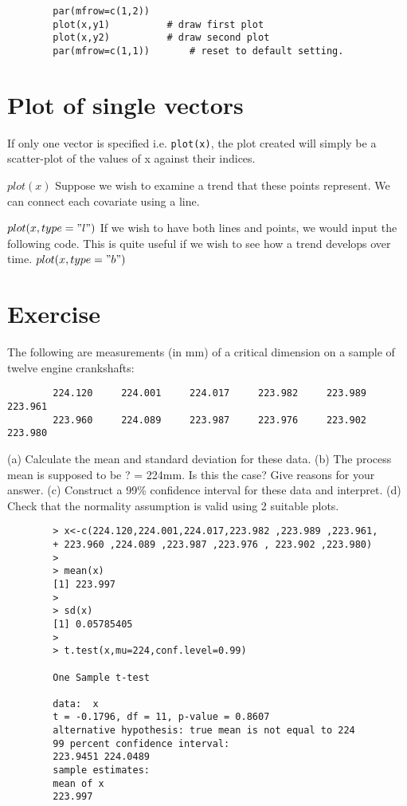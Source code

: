 \documentclass[a4paper,12pt]{article}
\begin{document}
\begin{itemize}
\begin{itemize}
		\begin{verbatim}
		par(mfrow=c(1,2))
		plot(x,y1)			# draw first plot
		plot(x,y2)			# draw second plot
		par(mfrow=c(1,1))		# reset to default setting.
		\end{verbatim}
		
		\section{Plot of single vectors}
		If only one vector is specified i.e. \texttt{plot(x)},  the plot created will simply be a scatter-plot of the values of x against their indices.
		
		$plot(x)$
		Suppose we wish to examine a trend that these points represent. We can connect each covariate using a line.
		
		$plot(x, type = "l")$
		If we wish to have both lines and points, we would input the following code. This is quite useful if we wish to see how a trend develops over time.
		$plot(x, type = "b")$
		
		
		
		
		
		
		
		
		
		\section{Exercise} The following are measurements (in mm) of a critical
		dimension on a sample of twelve engine crankshafts:
		
		\begin{verbatim}
		224.120 	224.001 	224.017 	223.982 	223.989 	223.961
		223.960 	224.089 	223.987 	223.976 	223.902 	223.980
		\end{verbatim}
		(a) Calculate the mean and standard deviation for these data.
		(b) The process mean is supposed to be ? = 224mm. Is this the
		case? Give reasons for your answer.
		(c) Construct a 99\% confidence interval for these data and interpret.
		(d) Check that the normality assumption is valid using 2 suitable plots.
		
		\begin{verbatim}
		> x<-c(224.120,224.001,224.017,223.982 ,223.989 ,223.961,
		+ 223.960 ,224.089 ,223.987 ,223.976 , 223.902 ,223.980)
		>
		> mean(x)
		[1] 223.997
		>
		> sd(x)
		[1] 0.05785405
		>
		> t.test(x,mu=224,conf.level=0.99)
		
		One Sample t-test
		
		data:  x
		t = -0.1796, df = 11, p-value = 0.8607
		alternative hypothesis: true mean is not equal to 224
		99 percent confidence interval:
		223.9451 224.0489
		sample estimates:
		mean of x
		223.997
		

\end{verbatim}
\end{itemize}
\end{itemize}
\end{document}
